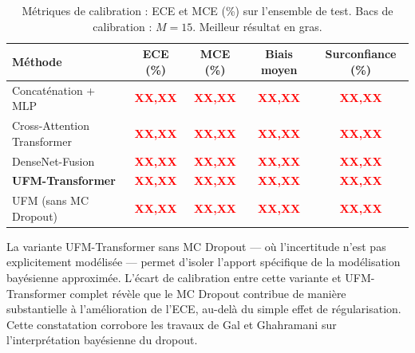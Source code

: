 \documentclass[12pt,a4paper]{report}
\begin{document}
\begin{table}[htbp]
    \centering
    \caption{M\'{e}triques de calibration : ECE et MCE (\%) sur l'ensemble de test. Bacs de calibration : $M = 15$. Meilleur r\'{e}sultat en gras.}
    \label{tab:ece}
    \begin{tabular}{lcccc}
        \hline
        \hline
        \textbf{M\'{e}thode} & \textbf{ECE (\%)} & \textbf{MCE (\%)} & \textbf{Biais moyen} & \textbf{Surconfiance (\%)} \\
        \hline
        Concat\'{e}nation + MLP & \textcolor{red}{\textbf{XX,XX}} & \textcolor{red}{\textbf{XX,XX}} & \textcolor{red}{\textbf{XX,XX}} & \textcolor{red}{\textbf{XX,XX}} \\
        Cross-Attention Transformer & \textcolor{red}{\textbf{XX,XX}} & \textcolor{red}{\textbf{XX,XX}} & \textcolor{red}{\textbf{XX,XX}} & \textcolor{red}{\textbf{XX,XX}} \\
        DenseNet-Fusion & \textcolor{red}{\textbf{XX,XX}} & \textcolor{red}{\textbf{XX,XX}} & \textcolor{red}{\textbf{XX,XX}} & \textcolor{red}{\textbf{XX,XX}} \\
        \rowcolor{gray!15}
        \textbf{UFM-Transformer} & \textcolor{red}{\textbf{XX,XX}} & \textcolor{red}{\textbf{XX,XX}} & \textcolor{red}{\textbf{XX,XX}} & \textcolor{red}{\textbf{XX,XX}} \\
        UFM (sans MC Dropout) & \textcolor{red}{\textbf{XX,XX}} & \textcolor{red}{\textbf{XX,XX}} & \textcolor{red}{\textbf{XX,XX}} & \textcolor{red}{\textbf{XX,XX}} \\
        \hline
        \hline
    \end{tabular}
\end{table}


La variante UFM-Transformer sans MC Dropout --- o\`{u} l'incertitude n'est pas explicitement mod\'{e}lis\'{e}e --- permet d'isoler l'apport sp\'{e}cifique de la mod\'{e}lisation bay\'{e}sienne approxim\'{e}e. L'\'{e}cart de calibration entre cette variante et UFM-Transformer complet r\'{e}v\`{e}le que le MC Dropout contribue de mani\`{e}re substantielle \`{a} l'am\'{e}lioration de l'ECE, au-del\`{a} du simple effet de r\'{e}gularisation. Cette constatation corrobore les travaux de Gal et Ghahramani \cite{gal2016dropout} sur l'interpr\'{e}tation bay\'{e}sienne du dropout.
\end{document}
